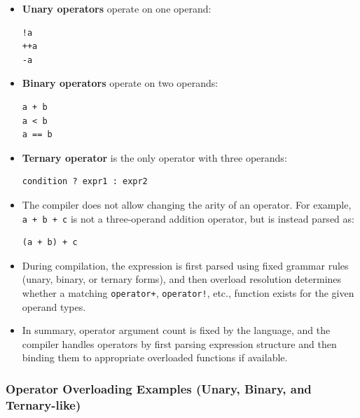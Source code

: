 \documentclass[10pt]{article}
\begin{document}
\begin{itemize}
\item \textbf{Unary operators} operate on one operand:
\begin{verbatim}
!a
++a
-a
\end{verbatim}

\item \textbf{Binary operators} operate on two operands:
\begin{verbatim}
a + b
a < b
a == b
\end{verbatim}

\item \textbf{Ternary operator} is the only operator with three operands:
\begin{verbatim}
condition ? expr1 : expr2
\end{verbatim}

\item The compiler does not allow changing the arity of an operator. For example, \verb|a + b + c| is not a three-operand addition operator, but is instead parsed as:
\begin{verbatim}
(a + b) + c
\end{verbatim}

\item During compilation, the expression is first parsed using fixed grammar rules (unary, binary, or ternary forms), and then overload resolution determines whether a matching \verb|operator+|, \verb|operator!|, etc., function exists for the given operand types.

\item In summary, operator argument count is fixed by the language, and the compiler handles operators by first parsing expression structure and then binding them to appropriate overloaded functions if available.
\end{itemize}

\newpage
\subsubsection{Operator Overloading Examples (Unary, Binary, and Ternary-like)}
\end{document}
